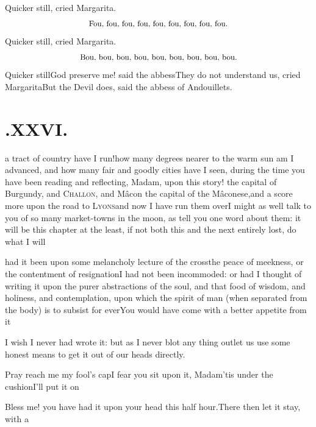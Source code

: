 \documentclass{article}
\begin{document}
Quicker still, cried Margarita.
$$\hbox{\small Fou, fou, fou, fou, fou, fou, fou, fou, fou.}$$
\quad Quicker still, cried Margarita.
$$\hbox{\small Bou, bou, bou, bou, bou, bou, bou, bou, bou.}$$
\quad Quicker still\tsk God preserve me! said the abbess\tsk They do not
understand us, cried Margarita\tsh But the Devil does, said the abbess
of Andouillets\sic.

\vfill{}\eject

\null\smallskip
\section{.\enspace XXVI.}

 a tract of country have I
run!\tsk how many degrees nearer to the warm sun am I advanced,
and how many fair and goodly cities have I seen, during the time
you have been reading and reflecting, Madam, upon this
story!\break
{}
the capital of Burgundy, and
\textsc{Challon}, and Mâcon the capital of the
Mâconese,\break and a score more upon the road to
\textsc{Lyons}\tsh and now I have run them
over\tsh I might as well talk to you of so many market-towns in the moon, as tell
you one word about them: it will be this chapter at the least, if not both this
and the next entirely lost, do what I will\tsh

\noindent
{}

\noindent
{}\break
had it been upon some melancholy lecture of the
cross\tsk the peace of meekness, or the contentment of
resignation\tsh I had not been incommoded: or had I thought of writing
it upon the purer abstractions of the soul, and that food of wisdom,
and holiness, and contemplation, upon which the spirit of man (when
separated from the body) is to subsist for ever\tsh You
would have come with a better appetite from it\tsh

\tsh I wish I never had wrote it: but as I never blot
any thing out\tsh let us use some honest means to get it
out of our heads directly.

\tsh Pray reach me my fool’s cap\tsh I
fear you sit upon it, Madam\tsh ’tis under the
cushion\tsh I’ll put it on\tsh

Bless me! you have had it upon your head this half
hour.\tsh There then let it stay, with a
\end{document}
